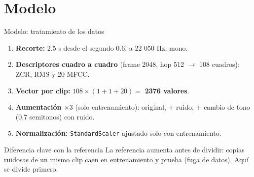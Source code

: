 \documentclass[aspectratio=169,11pt]{beamer}
\begin{document}
\section{Modelo}
\begin{frame}{Modelo: tratamiento de los datos}
  \begin{enumerate}
    \item \textbf{Recorte:} 2.5 s desde el segundo 0.6, a 22 050 Hz, mono.
    \item \textbf{Descriptores cuadro a cuadro} (frame 2048, hop 512 $\to$ 108 cuadros): ZCR, RMS y 20 MFCC.
    \item \textbf{Vector por clip:} $108 \times (1+1+20) = $ \textbf{2376 valores}.
    \item \textbf{Aumentación $\times 3$} (solo entrenamiento): original, + ruido, + cambio de tono (0.7 semitonos) con ruido.
    \item \textbf{Normalización:} \texttt{StandardScaler} ajustado solo con entrenamiento.
  \end{enumerate}
  \vspace{0.5em}
  \begin{block}{Diferencia clave con la referencia}
    La referencia aumenta antes de dividir: copias ruidosas de un mismo clip caen en entrenamiento y prueba
    (fuga de datos). Aquí se divide primero.
  \end{block}
\end{frame}
\end{document}
